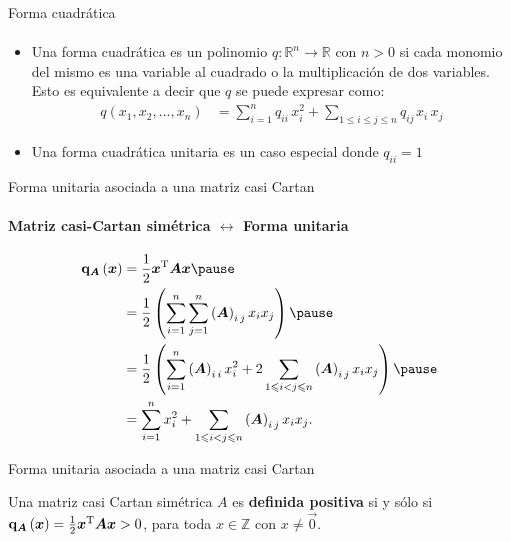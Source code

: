 \documentclass[spanish]{beamer}
\begin{document}
\begin{frame}{Forma cuadrática}
  \framesubtitle{}{}
  \begin{itemize}
  \item Una forma cuadrática es un polinomio $q : \mathbb{R}^{n} \rightarrow \mathbb{R}$ con $n > 0$ si cada monomio del mismo es una variable al cuadrado o la multiplicación de dos variables. Esto es equivalente a decir que $q$ se puede expresar como:
	\begin{align*}
    q\left(x_1, x_2,\ldots, x_n\right) &=  \sum_{i=1}^{n}q_{ii}\,x_{i}^{2} + \sum_{1 \leq i \leq j \leq n}q_{ij\,}x_{i}\,x_{j}
  \end{align*}
  \item Una forma cuadrática unitaria es un caso especial donde $q_{ii}=1$
  \end{itemize}
\end{frame}

\begin{frame}{Forma unitaria asociada a una matriz casi Cartan}
  \framesubtitle{Matriz casi-Cartan simétrica $\leftrightarrow$ Forma unitaria}
  \begin{align*}
    \Quadratic{\mat{A}}\left(\vec{x}\right) &= \frac{1}{2} 
    \transpose{\vec{x}} \mat{A} \vec{x}  \pause \\
    &= \frac{1}{2} \left( \sum_{i = 1}^{n} \sum_{j = 1}^{n} 
      \entry{\mat{A}}{i}{j} x_i x_j \right) \pause \\
    &= \frac{1}{2} \left(\sum_{i=1}^{n} \entry{\mat{A}}{i}{i} x_i^2
       + 2 \sum_{1 \le i < j \le n} \entry{\mat{A}}{i}{j} x_i x_j\right)  
       \pause \\
    &= \sum_{i=1}^{n} x_i^2 + \sum_{1 \le i < j \le n} \entry{\mat{A}}{i}{j}    
       x_i x_j \text{.}
  \end{align*}
\end{frame}

\begin{frame}{Forma unitaria asociada a una matriz casi Cartan}
  \begin{definition}
  Una matriz casi Cartan simétrica $A$ es \textbf{definida positiva} si y sólo si 
  $\mathbf{q}_{\boldsymbol{A}}\left(\boldsymbol{x}\right) = \frac{1}{2} {\boldsymbol{x}}^{\operatorname{T}} \boldsymbol{A} \boldsymbol{x}>0$, para toda $x\in \mathbb{Z}$ con $x\neq \vec{0}$.
  \end{definition}
\end{frame}
\end{document}
